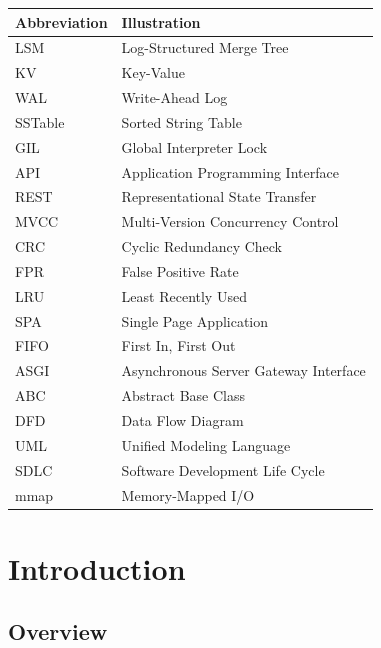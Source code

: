 \documentclass[oneside,a4paper,12pt]{book}
\begin{document}
\renewcommand{\arraystretch}{1.3}
\noindent
\begin{tabularx}{\textwidth}{|p{4cm}|X|}
\hline
\textbf{Abbreviation} & \textbf{Illustration} \\
\hline
LSM & Log-Structured Merge Tree \\
\hline
KV & Key-Value \\
\hline
WAL & Write-Ahead Log \\
\hline
SSTable & Sorted String Table \\
\hline
GIL & Global Interpreter Lock \\
\hline
API & Application Programming Interface \\
\hline
REST & Representational State Transfer \\
\hline
MVCC & Multi-Version Concurrency Control \\
\hline
CRC & Cyclic Redundancy Check \\
\hline
FPR & False Positive Rate \\
\hline
LRU & Least Recently Used \\
\hline
SPA & Single Page Application \\
\hline
FIFO & First In, First Out \\
\hline
ASGI & Asynchronous Server Gateway Interface \\
\hline
ABC & Abstract Base Class \\
\hline
DFD & Data Flow Diagram \\
\hline
UML & Unified Modeling Language \\
\hline
SDLC & Software Development Life Cycle \\
\hline
mmap & Memory-Mapped I/O \\
\hline
\end{tabularx}

\mainmatter
\pagestyle{mainmatter}
\setlength{\parindent}{5em}

\chapter{Introduction}

\section{Overview}
\end{document}
